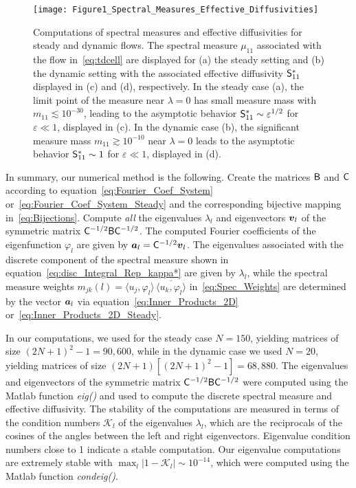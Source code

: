 \documentclass[amsa]{ipart}
\begin{document}
%
\begin{figure}[t]
  \centerline{\texttt{[image: Figure1\_Spectral\_Measures\_Effective\_Diffusivities]}} 
\caption{%
  Computations of spectral measures and effective diffusivities for
  steady and dynamic flows. The spectral measure $\mu_{11}$ associated
  with the flow in~\eqref{eq:tdcell} are displayed for (a) the steady
  setting and (b) the dynamic setting with the associated effective
  diffusivity $\mathsf{S}^*_{11}$ displayed in (c) and (d), respectively. In
  the steady case (a), the 
  limit point of the measure near $\lambda=0$ has small measure mass with
  $m_{11}\lesssim10^{-30}$, leading to the asymptotic behavior
  $\mathsf{S}^*_{11}\sim\varepsilon^{1/2}$ for $\varepsilon\ll1$, displayed in (c). In the dynamic case
  (b), the significant measure mass $m_{11}\gtrsim10^{-10}$
  near $\lambda=0$ leads to the asymptotic behavior
  $\mathsf{S}^*_{11}\sim1$ for $\varepsilon\ll1$, displayed in (d).
        }
\label{fig:Fig1_Spect_Meas_Eff_Diffus}
\end{figure}
%


In summary, our numerical method is the following. Create the matrices
$\mathsf{B}$ and $\mathsf{C}$ according to equation~\eqref{eq:Fourier_Coef_System}
or~\eqref{eq:Fourier_Coef_System_Steady} and the corresponding
bijective mapping in~\eqref{eq:Bijections}. Compute \emph{all} the
eigenvalues $\lambda_l$ and eigenvectors $\boldsymbol{v}_l$ of the symmetric matrix
$\mathsf{C}^{-1/2}\mathsf{B}\mathsf{C}^{-1/2}$. The computed Fourier coefficients of the
eigenfunction $\varphi_l$ are given by 
$\boldsymbol{a}_l=\mathsf{C}^{-1/2}\boldsymbol{v}_l$. The eigenvalues associated with the
discrete component of the spectral measure shown in
equation~\eqref{eq:disc_Integral_Rep_kappa*} are given by $\lambda_l$, while
the spectral measure weights $m_{jk}(l)=\langle u_j,\varphi_l\rangle\,\overline{\langle u_k,\varphi_l\rangle}$
in~\eqref{eq:Spec_Weights} are determined by the vector $\boldsymbol{a}_l$ via
equation~\eqref{eq:Inner_Products_2D}
or~\eqref{eq:Inner_Products_2D_Steady}.      



In our computations, we used for the steady case $N=150$, yielding
matrices of size $(2N+1)^2-1=90,600$, while in the dynamic case we used
$N=20$, yielding matrices of size $(2N+1)[(2N+1)^2-1]=68,880$. The
eigenvalues and eigenvectors of the symmetric matrix 
$\mathsf{C}^{-1/2}\mathsf{B}\mathsf{C}^{-1/2}$ were computed using the Matlab function
\emph{eig()} and used to compute the discrete spectral measure and
effective diffusivity. The stability of the computations are measured in terms
of the condition numbers $\mathcal{K}_l$ of the eigenvalues $\lambda_l$,
which are the reciprocals of the cosines of the angles between the
left and right eigenvectors. Eigenvalue condition numbers close to 1
indicate a stable computation. Our eigenvalue computations are
extremely stable with $\max_l|1-\mathcal{K}_l|\sim10^{-14}$, which were
computed using the Matlab function \emph{condeig()}.
\end{document}
